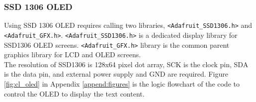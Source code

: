 \subsubsection{SSD 1306 OLED}
Using SSD 1306 OLED requires calling two libraries, \lstinline{<Adafruit_SSD1306.h>} and 
\lstinline{<Adafruit_GFX.h>}. \lstinline{<Adafruit_SSD1306.h>} is a dedicated display library for SSD1306 OLED 
screens. \lstinline{<Adafruit_GFX.h>} library is the common parent graphics library for LCD and OLED screens. \\
The resolution of SSD1306 is 128x64 pixel dot array, SCK is the clock pin, SDA is the data pin, and external 
power supply and GND are required. Figure \ref{fig:cl_oled} in Appendix \ref{append:figures} is the logic 
flowchart of the code to control the OLED to display the text content. 
\newpage

\newpage 